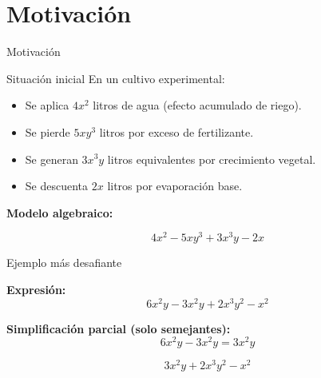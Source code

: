 \section{Motivación}
\begin{frame}{Motivación}
	
	\begin{block}{Situación inicial}
		En un cultivo experimental:
		
		\begin{itemize}
			\item Se aplica \(4x^2\) litros de agua (efecto acumulado de riego).
			\pause
			\item Se pierde \(5xy^3\) litros por exceso de fertilizante.
			\pause
			\item Se generan \(3x^3y\) litros equivalentes por crecimiento vegetal.
			\pause
			\item Se descuenta \(2x\) litros por evaporación base.
		\end{itemize}
	\end{block}
	
	\pause
	
	\textbf{Modelo algebraico:}
	
	\[
	4x^2 - 5xy^3 + 3x^3y - 2x
	\]
	
	\pause
	
	
\end{frame}

\begin{frame}{Ejemplo más desafiante}
	
	
	\pause
	
	\textbf{Expresión:}
	\[
	6x^2y - 3x^2y + 2x^3y^2 - x^2
	\]
	
	\pause
	
	\textbf{Simplificación parcial (solo semejantes):}
	\[
	6x^2y - 3x^2y = 3x^2y
	\]
	
	\pause
	
	\[
	3x^2y + 2x^3y^2 - x^2
	\]
	
	\pause
	
	
\end{frame}

